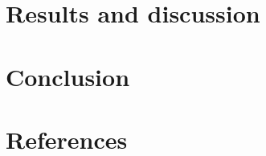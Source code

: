 \documentclass[10pt]{iopart}
\begin{document}
\section{Results and discussion}\label{sec:Rez}


\section{Conclusion}

\section*{References}



\end{document}
